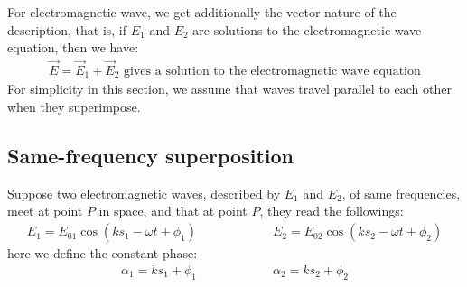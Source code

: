 \documentclass[11pt]{book}
\theoremstyle{break}
\theoremstyle{break}
\begin{document}
For electromagnetic wave, we get additionally the vector nature of the description, that is, if $E_1$ and $E_2$ are solutions to the electromagnetic wave equation, then we have:
\begin{align*}
\vec{E} = \vec{E}_1 + \vec{E}_2 \text{ gives a solution to the electromagnetic wave equation}
\end{align*}
For simplicity in this section, we assume that waves travel parallel to each other when they superimpose. 


\subsection{Same-frequency superposition}
Suppose two electromagnetic waves, described by $E_1$ and $E_2$, of same frequencies, meet at point $P$ in space, and that at point $P$, they read the followings:
\begin{align*}
E_1 = E_{01}\cos(ks_1 - \omega t + \phi_1) \qquad \qquad \qquad E_2 = E_{02}\cos(ks_2 - \omega t+ \phi_2)
\end{align*}
here we define the constant phase:
\begin{align*}
\alpha_1 = ks_1 + \phi_1 \qquad\qquad\qquad \alpha_2 = ks_2 + \phi_2
\end{align*}
\end{document}
